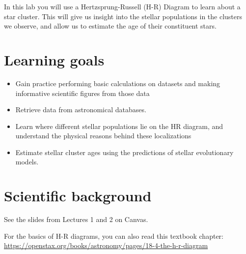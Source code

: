In this lab you will use a Hertzsprung-Russell (H-R) Diagram to learn about a star cluster. This will give us insight into the stellar populations in the clusters we observe, and allow us to estimate the age of their constituent stars. 

\section{Learning goals}

\begin{itemize}
	\item Gain practice performing basic calculations on datasets and making informative scientific figures from those data
	\item Retrieve data from astronomical databases.
	\item Learn where different stellar populations lie on the HR diagram, and understand the physical reasons behind these localizations
	\item Estimate stellar cluster ages using the predictions of stellar evolutionary models. 
\end{itemize}


\section{Scientific background}

See the slides from Lectures 1 and 2 on Canvas.

For the basics of H-R diagrams, you can also read this textbook chapter: \url{https://openstax.org/books/astronomy/pages/18-4-the-h-r-diagram}



